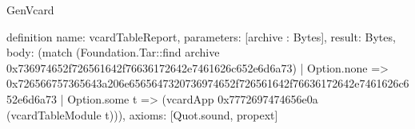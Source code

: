 \begin{lexlean}{GenVcard}
\begin{semanticmodule}
definition{
  name: vcardTableReport,
  parameters: [archive : Bytes],
  result: Bytes,
  body: (match (Foundation.Tar::find archive 0x736974652f726561642f76636172642e7461626c652e6d6a73)
    | Option.none => 0x726566757365643a206e6565647320736974652f726561642f76636172642e7461626c652e6d6a73
    | Option.some t => (vcardApp 0x7772697474656e0a (vcardTableModule t))),
  axioms: [Quot.sound, propext]
}
\end{semanticmodule}
\end{lexlean}
